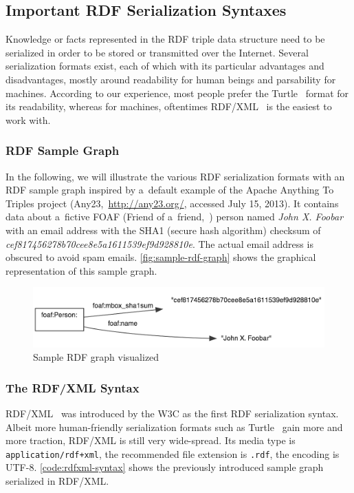 \subsection{Important RDF Serialization Syntaxes}

Knowledge or facts represented in the RDF triple data structure
need to be serialized in order to be stored
or transmitted over the Internet.
Several serialization formats exist,
each of which with its particular advantages
and disadvantages, mostly around readability for human beings
and parsability for machines.
According to our experience, most people prefer the Turtle~\cite{prudhommeaux2013turtle}
format for its readability,
whereas for machines, oftentimes RDF/XML~\cite{beckett2004rdfxml}
is the easiest to work with.

\subsubsection{RDF Sample Graph}
In the following, we will illustrate the various
RDF serialization formats with an RDF sample graph
inspired by a~default example of the Apache Anything To Triples project
(Any23,~\url{http://any23.org/}, accessed July 15, 2013).
It contains data about a~fictive FOAF (Friend of a~friend,~\cite{brickley2010foaf})
person named \emph{John X. Foobar}
with an email address with the SHA1 (secure hash algorithm) checksum of
\emph{cef817456278b70cee8e5a1611539\-ef9d928810e}.
The actual email address is obscured to avoid spam emails.
\autoref{fig:sample-rdf-graph} shows the graphical representation
of this sample graph.

\begin{figure}[!ht]
\centering
  \includegraphics[width=\linewidth]{sample-rdf-graph.png}
  \caption{Sample RDF graph visualized}
  \label{fig:sample-rdf-graph}
\end{figure}

\subsubsection{The RDF/XML Syntax}

RDF/XML~\cite{beckett2004rdfxml} was introduced by
the W3C as the first RDF serialization syntax.
Albeit more human-friendly serialization formats
such as Turtle~\cite{prudhommeaux2013turtle}
gain more and more traction,
RDF/XML is still very wide-spread.
Its media type is \texttt{application/rdf+xml},
the recommended file extension is \texttt{.rdf},
the encoding is UTF-8.
\autoref{code:rdfxml-syntax} shows the previously
introduced sample graph serialized in RDF/XML.

